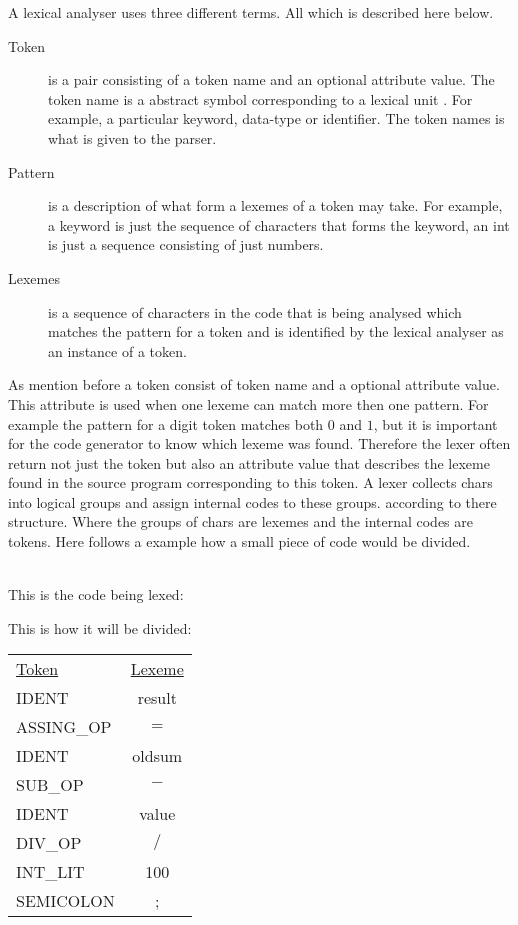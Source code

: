 A lexical analyser uses three different terms. All which is described here 
below. 
\begin{description}
  \item[Token]
    is a pair consisting of a token name and an optional attribute value. The 
token name is a abstract symbol corresponding to a lexical unit \cite{Aho2006}. 
For example, a particular keyword, data-type or identifier.  The token names is 
what is given to the parser. 
  \item[Pattern]
    is a description of what form a lexemes of a token may take. \cite{Aho2006} 
For example, a keyword is just the sequence of characters that forms the 
keyword, an int is just a sequence consisting of just numbers. 
  \item[Lexemes]
    is a sequence of characters in the code that is being analysed which 
matches the pattern for a token and is identified by the lexical analyser as an 
instance of a token. \cite{Aho2006}
\end{description}
As mention before a token consist of token name and a optional attribute value. 
This attribute is used when one lexeme can match more then one pattern. \cite
{Aho2006} For example the pattern for a digit token matches both $0$ and $1$, 
but it is important for the code generator to know which lexeme was found. 
Therefore the lexer often return not just the token but also an attribute value 
that describes the lexeme found in the source program corresponding to this 
token. \cite{Aho2006} A lexer collects chars into logical groups and assign 
internal codes to these groups. according to there structure.\cite{sebesta2012} 
Where the groups of chars are lexemes and the internal codes are tokens. Here 
follows a example how a small piece of code would be divided.
\begin{example} \label{codeToToken} \cite{sebesta2012} \\
This is the code being lexed:

This is how it will be divided:
\begin{center}
\begin{tabular}{l c}
\underline{Token} & \underline{Lexeme}\\
IDENT & result\\
ASSING\_OP & $=$\\
IDENT & oldsum\\
SUB\_OP & $-$\\
IDENT & value\\
DIV\_OP & $/$\\
INT\_LIT & 100\\
SEMICOLON & ;
\end{tabular}
\end{center}
\end{example}

